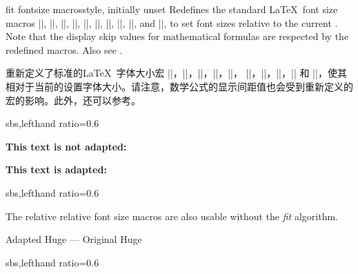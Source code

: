  
\begin{docTcbKey}{fit fontsize macros}{}{style, initially unset}
Redefines the standard \LaTeX\ font size macros
|\tiny|, |\scriptsize|, |\footnotesize|, |\small|, |\normalsize|,
|\large|, |\Large|, |\LARGE|, |\huge|, and |\Huge|,
to set font sizes relative to
the current . Note that the display skip values for
mathematical formulas are respected by the redefined macros.
Also see .

重新定义了标准的\LaTeX\ 字体大小宏
|\tiny|，|\scriptsize|，|\footnotesize|，|\small|，|\normalsize|，
|\large|，|\Large|，|\LARGE|，|\huge| 和 |\Huge|，使其相对于当前的设置字体大小。请注意，数学公式的显示间距值也会受到重新定义的宏的影响。此外，还可以参考。
\begin{dispExample*}{sbs,lefthand ratio=0.6}

\begin{tcolorbox}[fit to height=4cm]
  {\Large\bfseries This text is
             not adapted:\par}
  \lipsum[2]
\end{tcolorbox}

\begin{tcolorbox}[fit to height=4cm,
  fit fontsize macros ]
  {\Large\bfseries This text is adapted:\par}
  \lipsum[2]
\end{tcolorbox}
\end{dispExample*}

\begin{dispExample*}{sbs,lefthand ratio=0.6}

\let\realHuge=\Huge

\begin{tcolorbox}[fit basedim=7pt,
  fontupper=\normalsize,
  fit fontsize macros]
The relative relative font size macros
are also usable without the
\textit{fit} algorithm.\par
{\Huge Adapted Huge} ---
{\realHuge Original Huge}
\end{tcolorbox}

\end{dispExample*}


\begin{dispExample*}{sbs,lefthand ratio=0.6}

\tcboxfit[height=5cm,
  fit fontsize macros,
  fonttitle=\normalsize\bfseries,
  title=Adapted title]
{\lipsum[2]}

\end{dispExample*}
\end{docTcbKey}

